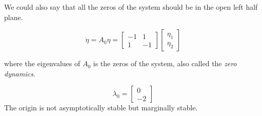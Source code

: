 We could also say that all the zeros of the system should be in the open left half plane.

\begin{equation}
        \dot{\eta} = A_0 \eta = 
        \begin{bmatrix}
                -1 & 1 \\
                1 & -1
        \end{bmatrix}
        \begin{bmatrix}
                \eta_1 \\
                \eta_2
        \end{bmatrix}
\end{equation}

where the eigenvalues of $A_0$ is the zeros of the system, also called the \textit{zero dynamics}.

\begin{equation}
        \lambda_0 = 
        \begin{bmatrix}
                0 \\
                -2 
        \end{bmatrix}
\end{equation}
The origin is not asymptotically stable but marginally stable.
